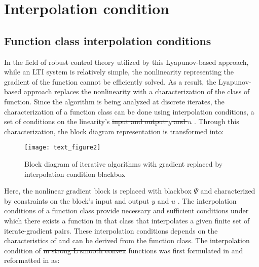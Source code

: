 \section{Interpolation condition}


\subsection*{Function class interpolation conditions}

In the field of robust control theory utilized by this Lyapunov-based approach, while an LTI system is relatively simple, the nonlinearity representing the gradient of the function cannot be efficiently solved. As a result, the Lyapunov-based approach replaces the nonlinearity with a characterization of the class of function. Since the algorithm is being analyzed at discrete iterates, the characterization of a function class can be done using interpolation conditions, a set of conditions on the linearity's  \sout{input and output $y$ and $u$} . Through this characterization, the block diagram representation is transformed into: 
\begin{figure}[h]
    \centering
	\texttt{[image: text\_figure2]}
    \caption{Block diagram of iterative algorithms with gradient replaced by interpolation condition blackbox}
    \label{plot_block_diagram2}
\end{figure}
Here, the nonlinear gradient block is replaced with blackbox $\Psi$ and characterized by constraints on the block's input and output $y$ and $u$ . The interpolation conditions of a function class provide necessary and sufficient conditions under which there exists a function in that class that interpolates a given finite set of iterate-gradient pairs. These interpolation conditions depends on the characteristics of and can be derived from the function class. The interpolation condition of \sout{m strong L smooth convex}  functions was first formulated in \cite{taylor2016} and reformatted in \cite{tutorial} as: 

